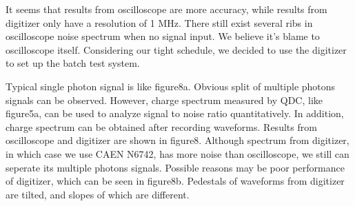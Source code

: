 \documentclass[11pt,a4paper]{article}
\begin{document}
It seems that results from oscilloscope are more accuracy, while results from digitizer only have a resolution of 1 MHz.
There still exist several ribs in oscilloscope noise spectrum when no signal input.
We believe it's blame to oscilloscope itself. Considering our tight schedule, we decided to use the digitizer to set up the batch test system.

Typical single photon signal is like figure8a. Obvious split of multiple photons signals can be observed. However, charge spectrum measured by QDC, like figure5a, can be used to analyze signal to noise ratio quantitatively. In addition, charge spectrum can be obtained after recording waveforms. Results from oscilloscope and digitizer are shown in figure8. Although spectrum from digitizer, in which case we use CAEN N6742, has more noise than oscilloscope, we still can seperate its multiple photons signals. Possible reasons may be poor performance of digitizer, which can be seen in figure8b. Pedestals of waveforms from digitizer are tilted, and slopes of which are different.
\end{document}
